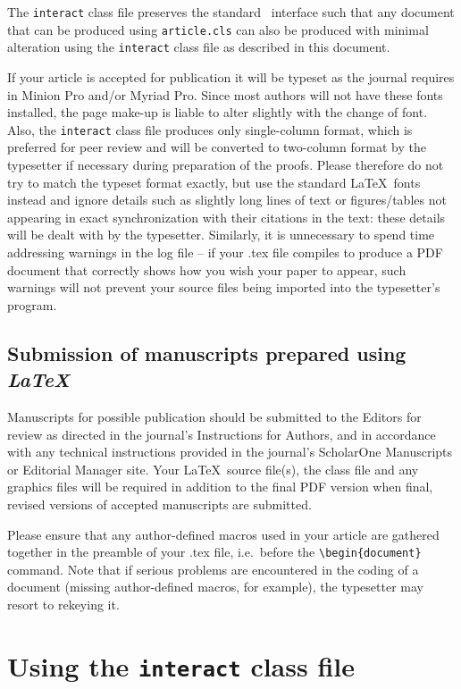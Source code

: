 \documentclass[]{interact}
\theoremstyle{plain}%
\theoremstyle{definition}
\theoremstyle{remark}
\begin{document}
The \texttt{interact} class file preserves the standard \LaTeXe\ interface such that any document that can be produced using \texttt{article.cls} can also be produced with minimal alteration using the \texttt{interact} class file as described in this document.

If your article is accepted for publication it will be typeset as the journal requires in Minion Pro and/or Myriad Pro. Since most authors will not have these fonts installed, the page make-up is liable to alter slightly with the change of font. Also, the \texttt{interact} class file produces only single-column format, which is preferred for peer review and will be converted to two-column format by the typesetter if necessary during preparation of the proofs. Please therefore do not try to match the typeset format exactly, but use the standard \LaTeX\ fonts instead and ignore details such as slightly long lines of text or figures/tables not appearing in exact synchronization with their citations in the text: these details will be dealt with by the typesetter. Similarly, it is unnecessary to spend time addressing warnings in the log file -- if your .tex file compiles to produce a PDF document that correctly shows how you wish your paper to appear, such warnings will not prevent your source files being imported into the typesetter's program.


\subsection{Submission of manuscripts prepared using \emph{\LaTeX}}

Manuscripts for possible publication should be submitted to the Editors for review as directed in the journal's Instructions for Authors, and in accordance with any technical instructions provided in the journal's ScholarOne Manuscripts or Editorial Manager site. Your \LaTeX\ source file(s), the class file and any graphics files will be required in addition to the final PDF version when final, revised versions of accepted manuscripts are submitted.

Please ensure that any author-defined macros used in your article are gathered together in the preamble of your .tex file, i.e.\ before the \verb"\begin{document}" command. Note that if serious problems are encountered in the coding of a document (missing author-defined macros, for example), the typesetter may resort to rekeying it.


\section{Using the \texttt{interact} class file}
\end{document}
